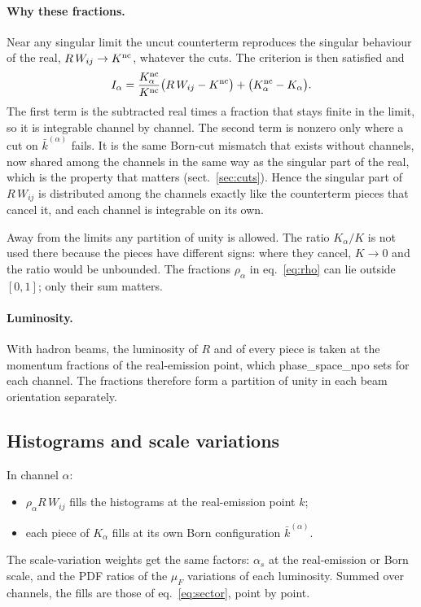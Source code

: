 \documentclass[11pt,a4paper]{article}
\newcommand{\kb}{\bar k}
\newcommand{\nc}{{\rm nc}}
\begin{document}
\paragraph{Why these fractions.}
Near any singular limit the uncut counterterm reproduces the singular
behaviour of the real, $R\,W_{ij}\to K^\nc$, whatever the cuts. The criterion is
then satisfied and
\begin{equation}
  I_\alpha = \frac{K^\nc_\alpha}{K^\nc}\big(R\,W_{ij}-K^\nc\big)
           + \big(K^\nc_\alpha - K_\alpha\big).
  \label{eq:Ilimit}
\end{equation}
The first term is the subtracted real times a fraction that stays finite in
the limit, so it is integrable channel by channel. The second term is nonzero only where a cut on
$\kb^{(\alpha)}$ fails. It is the same Born-cut mismatch that exists without
channels, now shared among the channels in the same way as the singular part
of the real, which is the property that matters (sect.~\ref{sec:cuts}).
Hence the singular part of $R\,W_{ij}$ is distributed among the channels
exactly like the counterterm pieces that cancel it, and each channel is
integrable on its own.

Away from the limits any partition of unity is allowed. The ratio
$K_\alpha/K$ is not used there because the pieces have different signs:
where they cancel, $K\to0$ and the ratio would be unbounded. The fractions
$\rho_\alpha$ in eq.~\eqref{eq:rho} can lie outside $[0,1]$; only their sum
matters.

\paragraph{Luminosity.}
With hadron beams, the luminosity of $R$ and of every piece is taken at the
momentum fractions of the real-emission point, which phase\_space\_npo sets
for each channel. The fractions therefore form a partition of unity in each
beam orientation separately.

\subsection{Histograms and scale variations}
In channel $\alpha$:
\begin{itemize}
\item $\rho_\alpha R\,W_{ij}$ fills the histograms at the real-emission point
      $k$;
\item each piece of $K_\alpha$ fills at its own Born configuration
      $\kb^{(\alpha)}$.
\end{itemize}
The scale-variation weights get the same factors: $\alpha_s$ at the
real-emission or Born scale, and the PDF ratios of the $\mu_F$ variations of
each luminosity. Summed over channels, the fills are those of
eq.~\eqref{eq:sector}, point by point.
\end{document}
